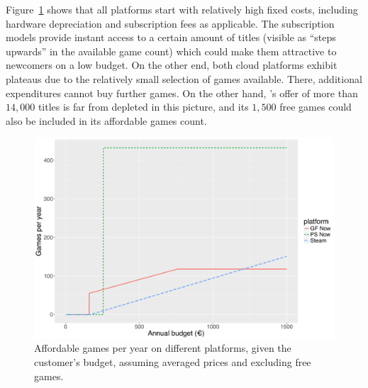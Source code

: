 
Figure~\ref{fig:gamesperyear-over-budget} shows that
all platforms start with relatively high fixed costs, including hardware
depreciation and subscription fees as applicable. The subscription
models provide instant access to a certain amount of titles (visible as
``steps upwards'' in the available game count) which could make them
attractive to newcomers on a low budget. On the other end, both cloud
platforms exhibit plateaus due to the relatively small selection of
games available. There, additional expenditures cannot buy further
games. On the other hand, \steam's offer of more than $14,000$
titles is far from depleted in this picture, and its $1,500$ free
games could also be included in its affordable games count.


\begin{figure}[!t]
	\centering
	\includegraphics[width=1.0\columnwidth]{images/gamesperyear-over-budget.pdf}
	\caption{Affordable games per year on different platforms, given the customer's budget, assuming averaged prices and excluding free \steam games.}
\label{fig:gamesperyear-over-budget}
\end{figure}


